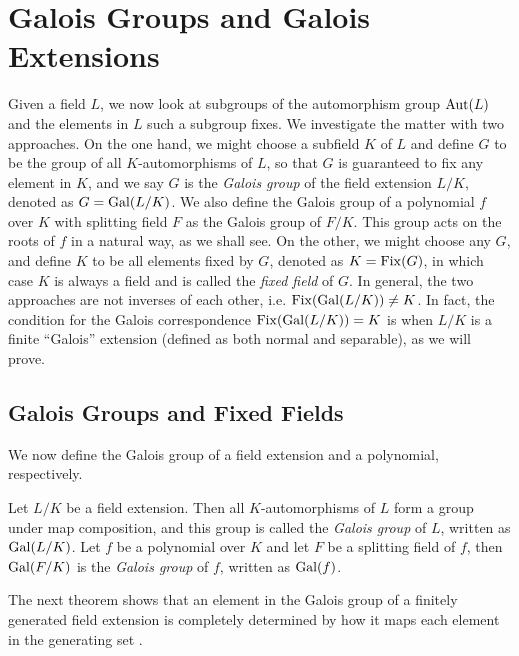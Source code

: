 \section{Galois Groups and Galois Extensions} \label{sec:galois-extensions}

Given a field $L$, we now look at subgroups of the automorphism group $\operatorname{Aut}(L)$ and the elements in $L$ such a subgroup fixes. We investigate the matter with two approaches. On the one hand, we might choose a subfield $K$ of $L$ and define $G$ to be the group of all $K$-automorphisms of $L$, so that $G$ is guaranteed to fix any element in $K$, and we say $G$ is the \textit{Galois group} of the field extension $L/K$, denoted as $G = \operatorname{Gal}(L/K)$. We also define the Galois group of a polynomial $f$ over $K$ with splitting field $F$ as the Galois group of $F / K$. This group acts on the roots of $f$ in a natural way, as we shall see. On the other, we might choose any $G$, and define $K$ to be all elements fixed by $G$, denoted as $K = \operatorname{Fix}(G)$, in which case $K$ is always a field and is called the \textit{fixed field} of $G$. In general, the two approaches are not inverses of each other, i.e. $\operatorname{Fix}(\operatorname{Gal}(L/K)) \neq K$. In fact, the condition for the Galois correspondence $\operatorname{Fix}(\operatorname{Gal}(L/K)) = K$ is when $L/K$ is a finite ``Galois'' extension (defined as both normal and separable), as we will prove. 


\subsection{Galois Groups and Fixed Fields}

We now define the Galois group of a field extension and a polynomial, respectively.
\begin{definition}
    Let $L/K$ be a field extension. Then all $K$-automorphisms of $L$ form a group under map composition, and this group is called the \textit{Galois group} of $L$, written as \(\operatorname{Gal}(L/K)\).
	Let $f$ be a polynomial over $K$ and let $F$ be a splitting field of $f$, then $\operatorname{Gal}(F/K)$ is the \textit{Galois group} of $f$, written as \(\operatorname{Gal}(f)\).
	
\end{definition}

The next theorem shows that an element in the Galois group of a finitely generated field extension is completely determined by how it maps each element in the generating set \cite{morandi_field_1996}. 

